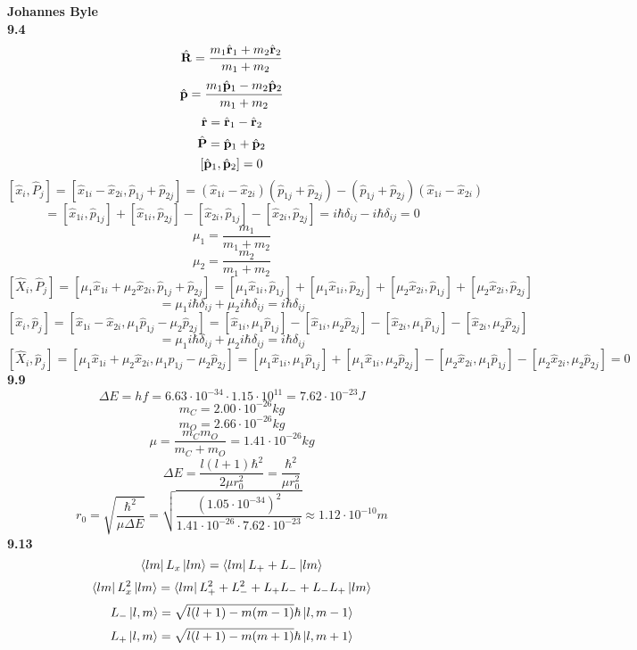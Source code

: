 \documentclass[english]{article}
\begin{document}
\textbf{Johannes Byle}\\
\noindent
\textbf{9.4}
$$\hat{\vb{R}}=\frac{m_1\hat{\vb{r}}_1+m_2\hat{\vb{r}}_2}{m_1+m_2}$$
$$\hat{\vb{p}}=\frac{m_1\hat{\vb{p}}_1-m_2\hat{\vb{p}}_2}{m_1+m_2}$$
$$\hat{\vb{r}}=\hat{\vb{r}}_1-\hat{\vb{r}}_2$$
$$\hat{\vb{P}}=\hat{\vb{p}}_1+\hat{\vb{p}}_2$$
$$\left[\hat{\vb{p}}_1,\hat{\vb{p}}_2\right]=0$$
$$\left[\hat{x}_i,\hat{P}_j\right]=\left[\hat{x}_{1i}-\hat{x}_{2i},\hat{p}_{1j}+\hat{p}_{2j}\right]=\left(\hat{x}_{1i}-\hat{x}_{2i}\right)\left(\hat{p}_{1j}+\hat{p}_{2j}\right)-\left(\hat{p}_{1j}+\hat{p}_{2j}\right)\left(\hat{x}_{1i}-\hat{x}_{2i}\right)$$
$$=\left[\hat{x}_{1i},\hat{p}_{1j}\right]+\left[\hat{x}_{1i},\hat{p}_{2j}\right]-\left[\hat{x}_{2i},\hat{p}_{1j}\right]-\left[\hat{x}_{2i},\hat{p}_{2j}\right]=i\hbar\delta_{ij}-i\hbar\delta_{ij}=0$$
$$\mu_1=\frac{m_1}{m_1+m_2}$$
$$\mu_2=\frac{m_2}{m_1+m_2}$$
$$\left[\hat{X}_i,\hat{P}_j\right]=\left[\mu_1\hat{x}_{1i}+\mu_2\hat{x}_{2i},\hat{p}_{1j}+\hat{p}_{2j}\right]=\left[\mu_1\hat{x}_{1i},\hat{p}_{1j}\right]+\left[\mu_1\hat{x}_{1i},\hat{p}_{2j}\right]+\left[\mu_2\hat{x}_{2i},\hat{p}_{1j}\right]+\left[\mu_2\hat{x}_{2i},\hat{p}_{2j}\right]$$
$$=\mu_1i\hbar\delta_{ij}+\mu_2i\hbar\delta_{ij}=i\hbar\delta_{ij}$$
$$\left[\hat{x}_i,\hat{p}_j\right]=\left[\hat{x}_{1i}-\hat{x}_{2i},\mu_1\hat{p}_{1j}-\mu_2\hat{p}_{2j}\right]=\left[\hat{x}_{1i},\mu_1\hat{p}_{1j}\right]-\left[\hat{x}_{1i},\mu_2\hat{p}_{2j}\right]-\left[\hat{x}_{2i},\mu_1\hat{p}_{1j}\right]-\left[\hat{x}_{2i},\mu_2\hat{p}_{2j}\right]$$
$$=\mu_1i\hbar\delta_{ij}+\mu_2i\hbar\delta_{ij}=i\hbar\delta_{ij}$$
$$\left[\hat{X}_i,\hat{p}_j\right]=\left[\mu_1\hat{x}_{1i}+\mu_2\hat{x}_{2i},\mu_1\hat{p}_{1j}-\mu_2\hat{p}_{2j}\right]=\left[\mu_1\hat{x}_{1i},\mu_1\hat{p}_{1j}\right]+\left[\mu_1\hat{x}_{1i},\mu_2\hat{p}_{2j}\right]-\left[\mu_2\hat{x}_{2i},\mu_1\hat{p}_{1j}\right]-\left[\mu_2\hat{x}_{2i},\mu_2\hat{p}_{2j}\right]=0$$
\noindent
\textbf{9.9}
$$\Delta E=hf=6.63\cdot10^{-34}\cdot1.15\cdot10^{11}=7.62\cdot10^{-23}J$$
$$m_C=2.00\cdot10^{-26}kg$$
$$m_O=2.66\cdot10^{-26}kg$$
$$\mu=\frac{m_Cm_O}{m_C+m_O}=1.41\cdot10^{-26}kg$$
$$\Delta E=\frac{l\left(l+1\right)\hbar^2}{2\mu r_0^2}=\frac{\hbar^2}{\mu r_0^2}$$
$$r_0=\sqrt{\frac{\hbar^2}{\mu\Delta E}}=\sqrt{\frac{\left(1.05\cdot10^{-34}\right)^2}{1.41\cdot10^{-26}\cdot7.62\cdot10^{-23}}}\approx1.12\cdot10^{-10}m$$
\noindent
\textbf{9.13}
$$\bra{lm}L_x\ket{lm}=\bra{lm}L_++L_-\ket{lm}$$
$$\bra{lm}L_x^2\ket{lm}=\bra{lm}L_+^2+L_-^2+L_+L_-+L_-L_+\ket{lm}$$
$$L_-\ket{l,m}=\sqrt{l(l+1)-m(m-1)}\hbar\ket{l,m-1}$$
$$L_+\ket{l,m}=\sqrt{l(l+1)-m(m+1)}\hbar\ket{l,m+1}$$
\end{document}
